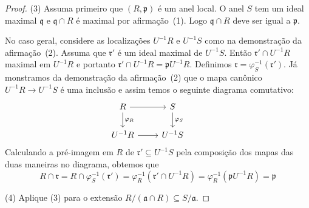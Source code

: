 \documentclass[12pt]{amsart}
\renewcommand{\a}{\mathfrak a}
\newcommand{\p}{\mathfrak p}
\newcommand{\q}{\mathfrak q}
\renewcommand{\r}{\mathfrak r}
\begin{document}
\begin{proof}
    (3) Assuma primeiro que $(R,\p)$ é um anel local. O anel $S$ tem um ideal maximal $\q$ e 
    $\q\cap R$ é maximal por afirmação~(1). Logo $\q\cap R$ deve ser igual a $\p$.


    No caso geral, considere as localizações $U^{-1}R$ e $U^{-1}S$ como na demonstração 
    da afirmação~(2).  
    Assuma que $\r'$ é um ideal maximal de $U^{-1}S$. Então $\r'\cap U^{-1}R$ maximal em $U^{-1}R$ 
    e portanto $\r'\cap U^{-1}R=\p U^{-1}R$. Definimos $\r=\varphi_S^{-1}(\r')$.
Já monstramos da demonstração da afirmação~(2) que o mapa canônico $U^{-1}R\to U^{-1}S$ é uma inclusão e 
assim temos o seguinte diagrama comutativo:
    \[\begin{tikzcd}
        \arrow{d}{\varphi_R}R \arrow{r} & S \arrow{d}{\varphi_S} &  \\
        U^{-1}R \arrow{r} & U^{-1}S 
    \end{tikzcd}
    \]
Calculando a pré-imagem em $R$ de $\r'\subseteq U^{-1}S$ pela composição dos mapas das duas 
maneiras no  diagrama, obtemos que  
\[ 
    R\cap \r=R\cap \varphi_S^{-1}(\r')=\varphi_R^{-1}(\r'\cap U^{-1}R)=\varphi_{R}^{-1}(\p U^{-1}R)=\p
\]      
    
    (4) Aplique (3) para o extensão $R/(\a\cap R)\subseteq S/\a$. 
\end{proof}
\end{document}
